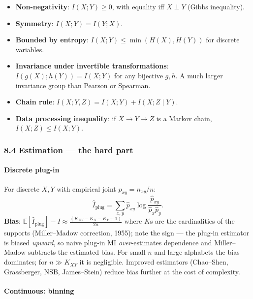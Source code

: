 \documentclass{article}
\providecommand{\tightlist}{\setlength{\itemsep}{0pt}\setlength{\parskip}{0pt}}
\begin{document}
\begin{itemize}
\tightlist
\item
  \textbf{Non-negativity}: \(I(X; Y) \geq 0\), with equality iff
  \(X \perp Y\) (Gibbs inequality).
\item
  \textbf{Symmetry}: \(I(X; Y) = I(Y; X)\).
\item
  \textbf{Bounded by entropy}: \(I(X; Y) \leq \min(H(X), H(Y))\) for
  discrete variables.
\item
  \textbf{Invariance under invertible transformations}:
  \(I(g(X); h(Y)) = I(X; Y)\) for any bijective \(g, h\). A much larger
  invariance group than Pearson or Spearman.
\item
  \textbf{Chain rule}: \(I(X; Y, Z) = I(X; Y) + I(X; Z \mid Y)\).
\item
  \textbf{Data processing inequality}: if \(X \to Y \to Z\) is a Markov
  chain, \(I(X; Z) \leq I(X; Y)\).
\end{itemize}

\subsubsection{8.4 Estimation --- the hard
part}\label{84-estimation--the-hard-part}

\paragraph{Discrete plug-in}\label{discrete-plug-in}

For discrete \(X, Y\) with empirical joint \(\hat{p}_{xy} = n_{xy}/n\):
\[
\hat{I}_{\text{plug}} = \sum_{x, y} \hat{p}_{xy} \log \frac{\hat{p}_{xy}}{\hat{p}_x \hat{p}_y}.
\] \textbf{Bias}:
\(\mathbb{E}[\hat{I}_{\text{plug}}] - I \approx \frac{(K_{XY} - K_X - K_Y + 1)}{2n}\)
where \(K\)\textquotesingle s are the cardinalities of the supports
(Miller--Madow correction, 1955); note the sign --- the plug-in
estimator is biased \emph{upward}, so naive plug-in MI \emph{over}-estimates
dependence and Miller--Madow subtracts the estimated bias.
For small \(n\) and large alphabets the bias dominates; for \(n \gg K_{XY}\)
it is negligible. Improved estimators (Chao--Shen, Grassberger, NSB,
James--Stein) reduce bias further at the cost of complexity.

\paragraph{Continuous: binning}\label{continuous-binning}
\end{document}
